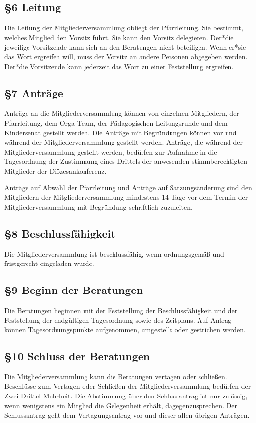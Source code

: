 \documentclass[12pt]{report}
\begin{document}
\begin{flushleft}
\subsection*{§6 Leitung}
Die Leitung der Mitgliederversammlung obliegt der Pfarrleitung. Sie bestimmt, welches Mitglied den Vorsitz
führt. Sie kann den Vorsitz delegieren. Der*die jeweilige Vorsitzende kann sich an den Beratungen nicht
beteiligen. Wenn er*sie das Wort ergreifen will, muss der Vorsitz an andere Personen abgegeben werden.
Der*die Vorsitzende kann jederzeit das Wort zu einer Feststellung ergreifen.
\subsection*{§7 Anträge}
Anträge an die Mitgliederversammlung können von einzelnen Mitgliedern, der Pfarrleitung, dem Orga-Team,
der Pädagogischen Leitungsrunde und dem Kindersenat gestellt werden. Die Anträge mit Begründungen
können vor und während der Mitgliederversammlung gestellt werden. Anträge, die während der
Mitgliederversammlung gestellt werden, bedürfen zur Aufnahme in die Tagesordnung der Zustimmung eines Drittels
der anwesenden stimmberechtigten Mitglieder der Diözesankonferenz.

Anträge auf Abwahl der Pfarrleitung und Anträge auf Satzungsänderung sind den Mitgliedern der
Mitgliederversammlung mindestens 14 Tage vor dem Termin der Mitgliederversammlung mit Begründung schriftlich
zuzuleiten.
\subsection*{§8 Beschlussfähigkeit}
Die Mitgliederversammlung ist beschlussfähig, wenn ordnungsgemäß und fristgerecht eingeladen wurde.
\subsection*{§9 Beginn der Beratungen}
Die Beratungen beginnen mit der Feststellung der Beschlussfähigkeit und der Feststellung der endgültigen
Tagesordnung sowie des Zeitplans. Auf Antrag können Tagesordnungspunkte aufgenommen, umgestellt
oder gestrichen werden.
\subsection*{§10 Schluss der Beratungen}
Die Mitgliederversammlung kann die Beratungen vertagen oder schließen. Beschlüsse zum Vertagen oder
Schließen der Mitgliederversammlung bedürfen der Zwei-Drittel-Mehrheit. Die Abstimmung über den
Schlussantrag ist nur zulässig, wenn wenigstens ein Mitglied die Gelegenheit erhält, dagegenzusprechen.
Der Schlussantrag geht dem Vertagungsantrag vor und dieser allen übrigen Anträgen.

\end{flushleft}
\end{document}
